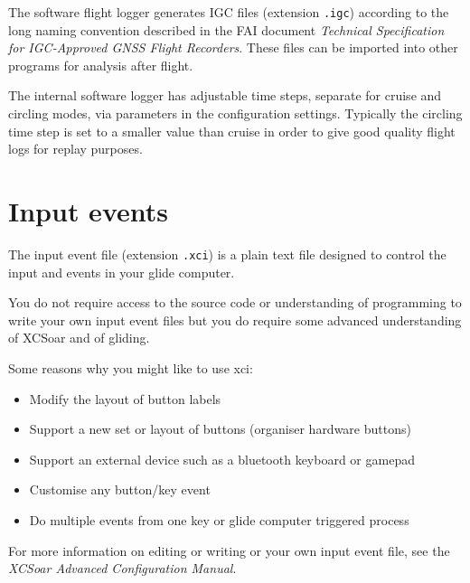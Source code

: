 The software flight logger generates IGC files (extension \verb|.igc|)
according to the long naming convention described in the FAI 
document {\em Technical Specification for IGC-Approved GNSS Flight Recorders}.  
These files can be imported into other programs for analysis after flight.

%

The internal software logger has adjustable time steps, separate for
cruise and circling modes, via parameters in the configuration
settings.  Typically the circling time step is set to a smaller value
than cruise in order to give good quality flight logs for replay
purposes.

\section{Input events}

The input event file (extension \verb|.xci|) is a plain text file
designed to control the input and events in your glide computer.

You do not require access to the source code or understanding of
programming to write your own input event files but you do require
some advanced understanding of XCSoar and of gliding.

Some reasons why you might like to use xci:
\begin{itemize}
\item Modify the layout of button labels
\item Support a new set or layout of buttons (organiser hardware buttons)
\item Support an external device such as a bluetooth keyboard or gamepad
\item Customise any button/key event
\item Do multiple events from one key or glide computer triggered process
\end{itemize}
For more information on editing or writing or your own input event
file, see the {\em XCSoar Advanced Configuration Manual}.


